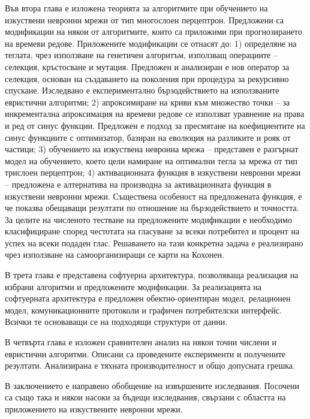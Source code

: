 Във втора глава е изложена теорията за алгоритмите при обучението на изкуствени невронни мрежи от тип многослоен перцептрон. Предложени са модификации на някои от алгоритмите, които са приложими при прогнозирането на времеви редове. Приложените модификации се отнасят до: 1) определяне на теглата, чрез използване на генетичен алгоритъм, използващ операциите – селекция, кръстосване и мутация. Предложен и анализиран е нов оператор за селекция, основан на създаването на поколения при процедура за рекурсивно спускане. Изследвано е експериментално бързодействието на използваните евристични алгоритми; 2) апроксимиране на криви към множество точки – за инкрементална апроксимация на времеви редове се използват уравнение на права и ред от синус функции. Предложен е подход за пресмятане на коефициентите на синус функциите с оптимизатор, базиран на еволюция на разликите и рояк от частици; 3) обучението на изкуствена невронна мрежа – представен е разгърнат модел на обучението, което цели намиране на оптимални тегла за мрежа от тип трислоен перцептрон; 4) активационната функция в изкуствени невронни мрежи – предложена е алтернатива на производна за активационната функция в изкуствени невронни мрежи. Съществена особеност на предложената функция, е че показва обещаващи резултати по отношение на бързодействието и точността. За целите на численото тестване на предложените модификации е необходимо класифициране според честотата на гласуване за всеки потребител и процент на успех на всеки подаден глас. Решаването на тази конкретна задача е реализирано чрез използване на самоорганизиращи се карти на Кохонен.

В трета глава е представена софтуерна архитектура, позволяваща реализация на избрани алгоритми и предложените модификации. За реализацията на софтуерната архитектура е предложен обектно-ориентиран модел, релационен модел, комуникационните протоколи и графичен потребителски интерфейс. Всички те основаващи се на подходящи структури от данни.

В четвърта глава е изложен сравнителен анализ на някои точни числени и евристични алгоритми. Описани са проведените експерименти и получените резултати.  Анализирана е тяхната производителност и общо допусната грешка.

В заключението е направено обобщение на извършените изследвания. Посочени са също така и някои насоки за бъдещи изследвания, свързани с областта на приложението на изкуствените невронни мрежи.